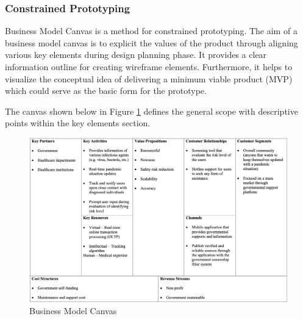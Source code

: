     \subsubsection{Constrained Prototyping}
      \par Business Model Canvas is a method for constrained prototyping. The aim of a business model canvas is to explicit the values of the product through aligning various key elements during design planning phase. It provides a clear information outline for creating wireframe elements. Furthermore, it helps to visualize the conceptual idea of delivering a minimum viable product (MVP) which could serve as the basic form for the prototype.

      \par The canvas shown below in Figure \ref{fig:bmc} defines the general scope with descriptive points within the key elements section.

      \begin{figure}[H]
        \centering
        \includegraphics[width=18cm]{img/bmc.png}
        \caption{Business Model Canvas}
        \label{fig:bmc}
      \end{figure}
    
